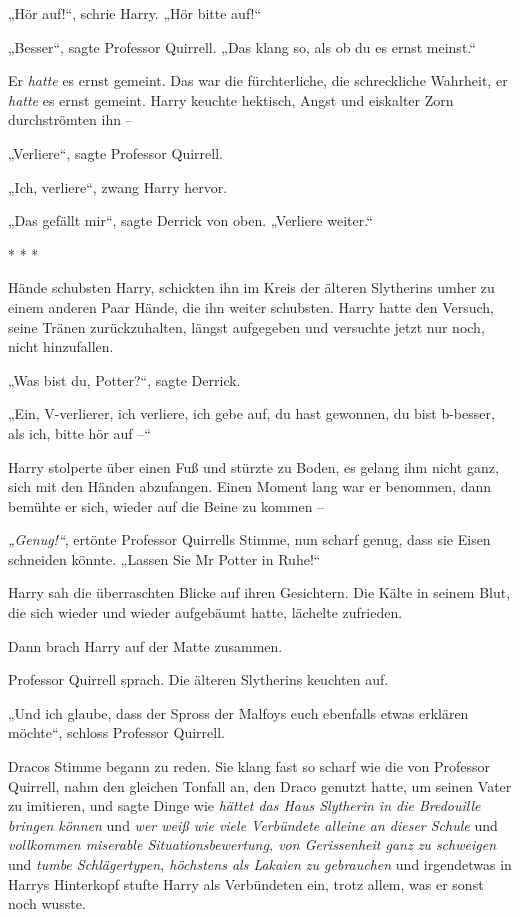 {„Hör auf!“, schrie Harry. „Hör bitte auf!“

„Besser“, sagte Professor Quirrell. „Das klang so, als ob du es ernst meinst.“

Er \emph{hatte} es ernst gemeint. Das war die fürchterliche, die schreckliche Wahrheit, er \emph{hatte} es ernst gemeint. Harry keuchte hektisch, Angst und eiskalter Zorn durchströmten ihn --

„Verliere“, sagte Professor Quirrell.

„Ich, verliere“, zwang Harry hervor.

„Das gefällt mir“, sagte Derrick von oben. „Verliere weiter.“

* * *

Hände schubsten Harry, schickten ihn im Kreis der älteren Slytherins umher zu einem anderen Paar Hände, die ihn weiter schubsten. Harry hatte den Versuch, seine Tränen zurückzuhalten, längst aufgegeben und versuchte jetzt nur noch, nicht hinzufallen.

„Was bist du, Potter?“, sagte Derrick.

„Ein, V-verlierer, ich verliere, ich gebe auf, du hast gewonnen, du bist b-besser, als ich, bitte hör auf --“

Harry stolperte über einen Fuß und stürzte zu Boden, es gelang ihm nicht ganz, sich mit den Händen abzufangen. Einen Moment lang war er benommen, dann bemühte er sich, wieder auf die Beine zu kommen --

\emph{„Genug!“}, ertönte Professor Quirrells Stimme, nun scharf genug, dass sie Eisen schneiden könnte. „Lassen Sie Mr Potter in Ruhe!“

Harry sah die überraschten Blicke auf ihren Gesichtern. Die Kälte in seinem Blut, die sich wieder und wieder aufgebäumt hatte, lächelte zufrieden.

Dann brach Harry auf der Matte zusammen.

Professor Quirrell sprach. Die älteren Slytherins keuchten auf.

„Und ich glaube, dass der Spross der Malfoys euch ebenfalls etwas erklären möchte“, schloss Professor Quirrell.

Dracos Stimme begann zu reden. Sie klang fast so scharf wie die von Professor Quirrell, nahm den gleichen Tonfall an, den Draco genutzt hatte, um seinen Vater zu imitieren, und sagte Dinge wie \emph{hättet das Haus Slytherin in die Bredouille bringen können} und \emph{wer weiß wie viele Verbündete alleine an dieser Schule} und \emph{vollkommen miserable Situationsbewertung, von Gerissenheit ganz zu schweigen} und \emph{tumbe Schlägertypen, höchstens als Lakaien zu gebrauchen} und irgendetwas in Harrys Hinterkopf stufte Harry als Verbündeten ein, trotz allem, was er sonst noch wusste.

}
